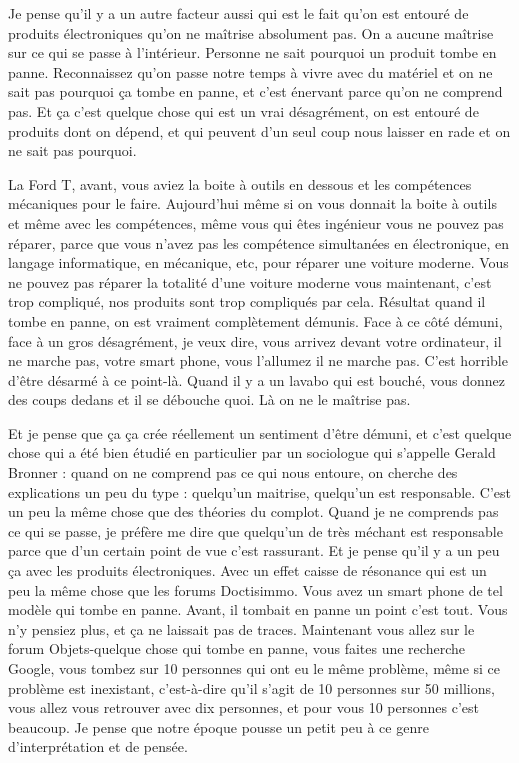 \begin{small}
Je pense qu'il y a un autre facteur aussi qui est le fait qu'on est entouré de produits électroniques qu'on ne maîtrise absolument pas. On a aucune maîtrise sur ce qui se passe à l'intérieur. Personne ne sait pourquoi un produit tombe en panne. Reconnaissez qu'on passe notre temps à vivre avec du matériel et on ne sait pas pourquoi ça tombe en panne, et c'est énervant parce qu'on ne comprend pas. Et ça c'est quelque chose qui est un vrai désagrément, on est entouré de produits dont on dépend, et qui peuvent d'un seul coup nous laisser en rade et on ne sait pas pourquoi. 

La Ford T, avant, vous aviez la boite à outils en dessous et les compétences mécaniques pour le faire. Aujourd'hui même si on vous donnait la boite à outils et même avec les compétences, même vous qui êtes ingénieur vous ne pouvez pas réparer, parce que vous n'avez pas les compétence simultanées en  électronique, en langage informatique, en mécanique, etc, pour réparer une voiture moderne. Vous ne pouvez pas réparer la totalité d'une voiture moderne vous maintenant, c'est trop compliqué, nos produits sont trop compliqués par cela. Résultat quand il tombe en panne, on est vraiment complètement démunis. Face à ce côté démuni, face à un gros désagrément, je veux dire, vous arrivez devant votre ordinateur, il ne marche pas, votre smart phone, vous l'allumez il ne marche pas. C'est horrible d'être désarmé à ce point-là. Quand il y a un lavabo qui est bouché, vous donnez des coups dedans et il se débouche quoi. Là on ne le maîtrise pas. 

Et je pense que ça ça crée réellement un sentiment d'être démuni, et c'est quelque chose qui a été bien étudié en particulier par un sociologue qui s'appelle Gerald Bronner : quand on ne comprend pas ce qui nous entoure, on cherche des explications un peu du type : quelqu'un maitrise, quelqu'un est responsable. C'est un peu la même chose que des théories du complot. Quand je ne comprends pas ce qui se passe, je préfère me dire que quelqu'un de très méchant est responsable parce que d'un certain point de vue c'est rassurant. Et je pense qu'il y a un peu ça avec les produits électroniques. Avec un effet caisse de résonance qui est un peu la même chose que les forums Doctisimmo. Vous avez un smart phone de tel modèle qui tombe en panne. Avant, il tombait en panne un point c'est tout. Vous n'y pensiez plus, et ça ne laissait pas de traces. Maintenant vous allez sur le forum Objets-quelque chose qui tombe en panne, vous faites une recherche Google, vous tombez sur 10 personnes qui ont eu le même problème, même si ce problème est inexistant, c'est-à-dire qu'il s'agit de 10 personnes sur 50 millions, vous allez vous retrouver avec dix personnes, et pour vous 10 personnes c'est beaucoup. Je pense que notre époque pousse un petit peu à ce genre d'interprétation et de pensée. 


\end{small}

